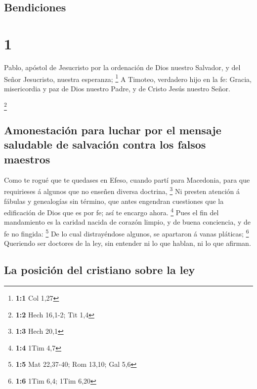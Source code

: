 \hypertarget{bendiciones}{%
\subsection{Bendiciones}\label{bendiciones}}

\hypertarget{section}{%
\section{1}\label{section}}

 Pablo, apóstol de Jesucristo por la ordenación de Dios
nuestro Salvador, y del Señor Jesucristo, nuestra esperanza; \footnote{\textbf{1:1}
  Col 1,27}  A Timoteo, verdadero hijo en la fe: Gracia,
misericordia y paz de Dios nuestro Padre, y de Cristo Jesús nuestro
Señor.

\footnote{\textbf{1:2} Hech 16,1-2; Tit 1,4}

\hypertarget{amonestaciuxf3n-para-luchar-por-el-mensaje-saludable-de-salvaciuxf3n-contra-los-falsos-maestros}{%
\subsection{Amonestación para luchar por el mensaje saludable de
salvación contra los falsos
maestros}\label{amonestaciuxf3n-para-luchar-por-el-mensaje-saludable-de-salvaciuxf3n-contra-los-falsos-maestros}}

 Como te rogué que te quedases en Efeso, cuando partí para
Macedonia, para que requirieses á algunos que no enseñen diversa
doctrina, \footnote{\textbf{1:3} Hech 20,1}  Ni presten
atención á fábulas y genealogías sin término, que antes engendran
cuestiones que la edificación de Dios que es por fe; así te encargo
ahora. \footnote{\textbf{1:4} 1Tim 4,7}  Pues el fin del
mandamiento es la caridad nacida de corazón limpio, y de buena
conciencia, y de fe no fingida: \footnote{\textbf{1:5} Mat 22,37-40; Rom
  13,10; Gal 5,6}  De lo cual distrayéndose algunos, se
apartaron á vanas pláticas; \footnote{\textbf{1:6} 1Tim 6,4; 1Tim 6,20}
 Queriendo ser doctores de la ley, sin entender ni lo que
hablan, ni lo que afirman.

\hypertarget{la-posiciuxf3n-del-cristiano-sobre-la-ley}{%
\subsection{La posición del cristiano sobre la
ley}\label{la-posiciuxf3n-del-cristiano-sobre-la-ley}}

